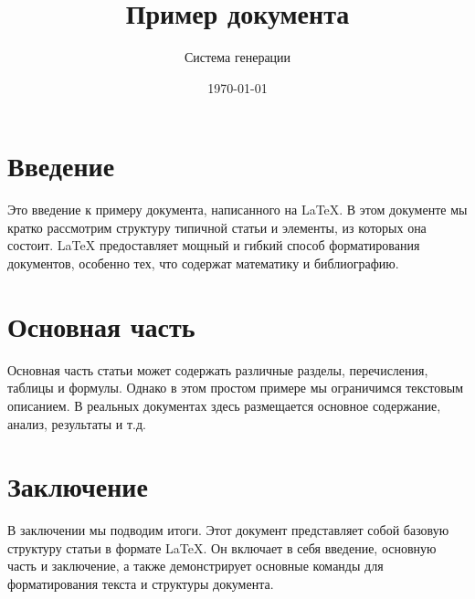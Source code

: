\documentclass{article}
\title{Пример документа}
\author{Система генерации}
\date{\today}
\begin{document}
\maketitle

\section{Введение}
Это введение к примеру документа, написанного на LaTeX. В этом документе мы кратко рассмотрим структуру типичной статьи и элементы, из которых она состоит. LaTeX предоставляет мощный и гибкий способ форматирования документов, особенно тех, что содержат математику и библиографию.

\section{Основная часть}
Основная часть статьи может содержать различные разделы, перечисления, таблицы и формулы. Однако в этом простом примере мы ограничимся текстовым описанием. В реальных документах здесь размещается основное содержание, анализ, результаты и т.д.

\section{Заключение}
В заключении мы подводим итоги. Этот документ представляет собой базовую структуру статьи в формате LaTeX. Он включает в себя введение, основную часть и заключение, а также демонстрирует основные команды для форматирования текста и структуры документа.
\end{document}
